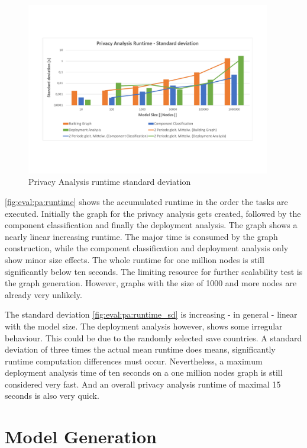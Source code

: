 \begin{figure}[h]
	\centering
	\includegraphics[trim = 5mm 30mm 10mm 30mm, clip, width=0.95\textwidth]{graphs/Runtime_pa_sd}
	\caption{Privacy Analysis runtime standard deviation}
	\label{fig:eval:pa:runtime_sd}
\end{figure}

\autoref{fig:eval:pa:runtime} shows the accumulated runtime in the order the tasks are executed. Initially the graph for the privacy analysis gets created, followed by the component classification and finally the deployment analysis. The graph shows a nearly linear increasing runtime. The major time is consumed by the graph construction, while the component classification and deployment analysis only show minor size effects. The whole runtime for one million nodes is still significantly below ten seconds. The limiting resource for further scalability test is the graph generation. However, graphs with the size of 1000 and more nodes are already very unlikely.

The standard deviation \autoref{fig:eval:pa:runtime_sd} is increasing - in general - linear with the model size. The deployment analysis however, shows some irregular behaviour. This could be due to the randomly selected save countries. A standard deviation of three times the actual mean runtime does means, significantly runtime computation differences must occur. Nevertheless, a maximum deployment analysis time of ten seconds on a one million nodes graph is still considered very fast. And an overall privacy analysis runtime of maximal 15 seconds is also very quick.


\section{Model Generation}
\label{sec:Evaluation:generation}

